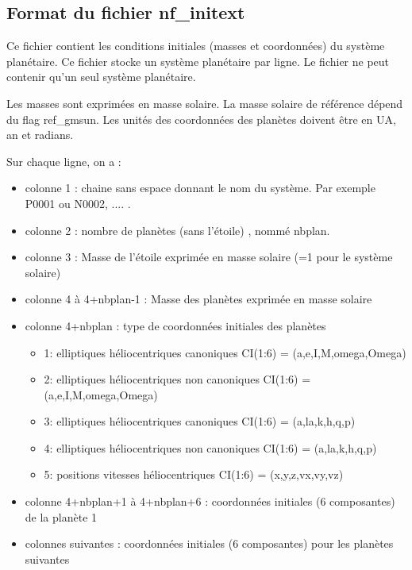 \documentclass[11pt]{article}
\begin{document}
\subsection{Format du fichier nf\_initext}

Ce fichier contient les conditions initiales (masses et coordonn\'ees) du syst\`eme plan\'etaire. 
Ce fichier stocke un syst\`eme plan\'etaire par ligne.
Le fichier ne peut contenir qu'un seul syst\`eme plan\'etaire.

Les masses sont exprimées en masse solaire.  La masse solaire de référence dépend du flag ref\_gmsun.
Les unit\'es des coordonn\'ees des plan\`etes doivent \^etre en UA, an et radians.

Sur chaque ligne, on a :
\begin{itemize}
\item colonne 1 : chaine sans espace donnant le nom du syst\`eme. Par exemple P0001 ou N0002, .... .
\item colonne 2 : nombre de plan\`etes (sans l'\'etoile) , nomm\'e nbplan.
\item colonne 3 : Masse de  l'\'etoile exprimée en masse solaire (=1 pour le système solaire)
\item colonne 4 \`a 4+nbplan-1 : Masse des plan\`etes exprimée en masse solaire 
\item colonne 4+nbplan : type de coordonn\'ees initiales des plan\`etes
\begin{itemize}
\item 1:  elliptiques h\'eliocentriques canoniques
	     CI(1:6) = (a,e,I,M,omega,Omega)
\item 2:  elliptiques h\'eliocentriques non canoniques
	     CI(1:6) = (a,e,I,M,omega,Omega)
\item 3:  elliptiques h\'eliocentriques canoniques
	     CI(1:6) = (a,la,k,h,q,p)
\item 4:  elliptiques h\'eliocentriques non canoniques
	     CI(1:6) = (a,la,k,h,q,p)
\item 5:  positions vitesses h\'eliocentriques
	     CI(1:6) = (x,y,z,vx,vy,vz)
\end{itemize}

\item colonne 4+nbplan+1 \`a  4+nbplan+6 :   coordonn\'ees initiales (6 composantes) de la plan\`ete 1
\item  colonnes suivantes :   coordonn\'ees initiales (6 composantes) pour les plan\`etes suivantes
\end{itemize}
\end{document}
